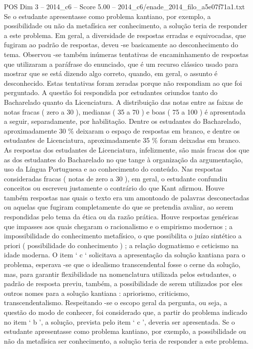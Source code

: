 \begin{textsample}{POS Dim 3 – 2014\_c6 – Score 5.00 – 2014\_c6/enade\_2014\_filo\_a5e07f71a1.txt}
Se o estudante apresentasse como problema kantiano, por exemplo, a possibilidade ou não da metafísica ser conhecimento, a solução teria de responder a este problema.
Em geral, a diversidade de respostas erradas e equivocadas, que fugiram ao padrão de respostas, deveu -se basicamente ao desconhecimento do tema.
Observou -se também inúmeras tentativas de encaminhamento de respostas que utilizaram a paráfrase do enunciado, que é um recurso clássico usado para mostrar que se está dizendo algo correto, quando, em geral, o assunto é desconhecido.
Estas tentativas foram zeradas porque não respondiam ao que foi perguntado.
A questão foi respondida por estudantes oriundos tanto do Bacharelado quanto da Licenciatura.
A distribuição das notas entre as faixas de notas fracas ( zero a 30 ), medianas ( 35 a 70 ) e boas ( 75 a 100 ) é apresentada a seguir, separadamente, por habilitação.
Dentre os estudantes do Bacharelado, aproximadamente 30 \% deixaram o espaço de respostas em branco, e dentre os estudantes de Licenciatura, aproximadamente 35 \% foram deixadas em branco.
As respostas dos estudantes de Licenciatura, infelizmente, são mais fracas dos que as dos estudantes do Bacharelado no que tange à organização da argumentação, uso da Língua Portuguesa e ao conhecimento do conteúdo.
Nas respostas consideradas fracas ( notas de zero a 30 ), em geral, o estudante confundiu conceitos ou escreveu justamente o contrário do que Kant afirmou.
Houve também respostas nas quais o texto era um amontoado de palavras desconectadas ou aquelas que fugiram completamente do que se pretendia avaliar, ao serem respondidas pelo tema da ética ou da razão prática.
Houve respostas genéricas que impasses aos quais chegaram o racionalismo e o empirismo modernos ; a impossibilidade do conhecimento metafísico, o que possibilita o juízo sintético a priori ( possibilidade do conhecimento ) ; a relação dogmatismo e ceticismo na idade moderna.
O item ‘ c ‘ solicitava a apresentação da solução kantiana para o problema, esperava -se que o idealismo transcendental fosse o cerne da solução, mas, para garantir flexibilidade na nomenclatura utilizada pelos estudantes, o padrão de resposta previu, também, a possibilidade de serem utilizados por eles outros nomes para a solução kantiana : apriorismo, criticismo, transcendentalismo.
Respeitando -se o escopo geral da pergunta, ou seja, a questão do modo de conhecer, foi considerado que, a partir do problema indicado no item ‘ b ’, a solução, prevista pelo item ‘ c ’, deveria ser apresentada.
Se o estudante apresentasse como problema kantiano, por exemplo, a possibilidade ou não da metafísica ser conhecimento, a solução teria de responder a este problema.

\end{textsample}
